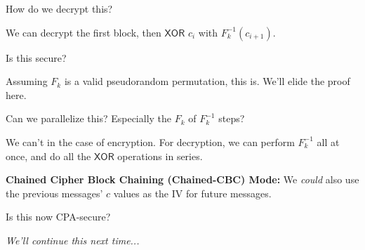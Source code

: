 \begin{ques*}
    How do we decrypt this?
\end{ques*}
We can decrypt the first block, then $\mathsf{XOR}$ $c_i$ with $F^{-1}_k(c_{i+1})$.

\begin{ques*}
    Is this secure?
\end{ques*}
Assuming $F_k$ is a valid pseudorandom permutation, this is. We'll elide the proof here.

\begin{ques*}
    Can we parallelize this? Especially the $F_k$ of $F_k^{-1}$ steps?
\end{ques*}
We can't in the case of encryption. For decryption, we can perform $F_k^{-1}$ all at once, and do all the $\mathsf{XOR}$ operations in series.

\textbf{Chained Cipher Block Chaining (Chained-CBC) Mode:}
We \emph{could} also use the previous messages' $c$ values as the IV for future messages.


\begin{ques*}
    Is this now CPA-secure?
\end{ques*}
\emph{We'll continue this next time...}